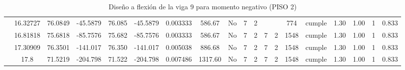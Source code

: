 \begin{table}[H]
{\begin{tabular}{|c|c|c|c|c|c|r|c|c|c|c|c|c|c|c|c|c|c|c|}
\cline{2-19}        & 16.32727 & 76.0849 & -45.5879 & 76.085 & -45.5879 & 0.003333 & 586.67 & No  & 7   & 2   &     &     & 774 & \cellcolor[rgb]{ .776,  .937,  .808}cumple & 1.30 & 1.00 & 1   & 0.833 \bigstrut\\
\cline{2-19}        & 16.81818 & 75.6818 & -85.7576 & 75.682 & -85.7576 & 0.003333 & 586.67 & No  & 7   & 2   & 7   & 2   & 1548 & \cellcolor[rgb]{ .776,  .937,  .808}cumple & 1.30 & 1.00 & 1   & 0.833 \bigstrut\\
\cline{2-19}        & 17.30909 & 76.3501 & -141.017 & 76.350 & -141.017 & 0.005038 & 886.68 & No  & 7   & 2   & 7   & 2   & 1548 & \cellcolor[rgb]{ .776,  .937,  .808}cumple & 1.30 & 1.00 & 1   & 0.833 \bigstrut\\
\cline{2-19}        & 17.8 & 71.5219 & -204.798 & 71.522 & -204.798 & 0.007486 & 1317.60 & No  & 7   & 2   & 7   & 2   & 1548 & \cellcolor[rgb]{ .776,  .937,  .808}cumple & 1.30 & 1.00 & 1   & 0.833 \bigstrut\\
    \hline
    \end{tabular}
  
  

  }
      \caption{Diseño a flexión de la viga 9 para momento negativo (PISO 2) }
  \label{tab:F VG9 P2 M-}%
\end{table}%
